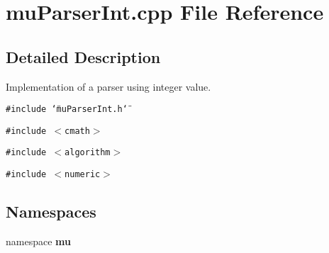 \section{muParserInt.cpp File Reference}
\label{muParserInt_8cpp}


\subsection{Detailed Description}
Implementation of a parser using integer value. 



{\tt \#include \char`\"{}muParserInt.h\char`\"{}}\par
{\tt \#include $<$cmath$>$}\par
{\tt \#include $<$algorithm$>$}\par
{\tt \#include $<$numeric$>$}\par
\subsection*{Namespaces}
\begin{CompactItemize}
\item 
namespace {\bf mu}
\end{CompactItemize}
